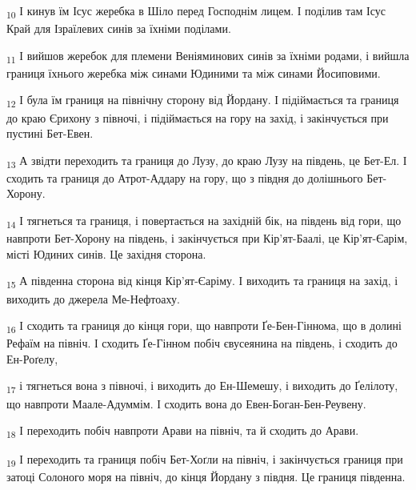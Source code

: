 \begin{tcolorbox}
\textsubscript{10} І кинув їм Ісус жеребка в Шіло перед Господнім лицем. І поділив там Ісус Край для Ізраїлевих синів за їхніми поділами.
\end{tcolorbox}
\begin{tcolorbox}
\textsubscript{11} І вийшов жеребок для племени Веніяминових синів за їхніми родами, і вийшла границя їхнього жеребка між синами Юдиними та між синами Йосиповими.
\end{tcolorbox}
\begin{tcolorbox}
\textsubscript{12} І була їм границя на північну сторону від Йордану. І підіймається та границя до краю Єрихону з півночі, і підіймається на гору на захід, і закінчується при пустині Бет-Евен.
\end{tcolorbox}
\begin{tcolorbox}
\textsubscript{13} А звідти переходить та границя до Лузу, до краю Лузу на південь, це Бет-Ел. І сходить та границя до Атрот-Аддару на гору, що з півдня до долішнього Бет-Хорону.
\end{tcolorbox}
\begin{tcolorbox}
\textsubscript{14} І тягнеться та границя, і повертається на західній бік, на південь від гори, що навпроти Бет-Хорону на південь, і закінчується при Кір'ят-Баалі, це Кір'ят-Єарім, місті Юдиних синів. Це західня сторона.
\end{tcolorbox}
\begin{tcolorbox}
\textsubscript{15} А південна сторона від кінця Кір'ят-Єаріму. І виходить та границя на захід, і виходить до джерела Ме-Нефтоаху.
\end{tcolorbox}
\begin{tcolorbox}
\textsubscript{16} І сходить та границя до кінця гори, що навпроти Ґе-Бен-Гіннома, що в долині Рефаїм на північ. І сходить Ґе-Гінном побіч євусеянина на південь, і сходить до Ен-Роґелу,
\end{tcolorbox}
\begin{tcolorbox}
\textsubscript{17} і тягнеться вона з півночі, і виходить до Ен-Шемешу, і виходить до Ґелілоту, що навпроти Маале-Адуммім. І сходить вона до Евен-Боган-Бен-Реувену.
\end{tcolorbox}
\begin{tcolorbox}
\textsubscript{18} І переходить побіч навпроти Арави на північ, та й сходить до Арави.
\end{tcolorbox}
\begin{tcolorbox}
\textsubscript{19} І переходить та границя побіч Бет-Хоґли на північ, і закінчується границя при затоці Солоного моря на північ, до кінця Йордану з півдня. Це границя південна.
\end{tcolorbox}

